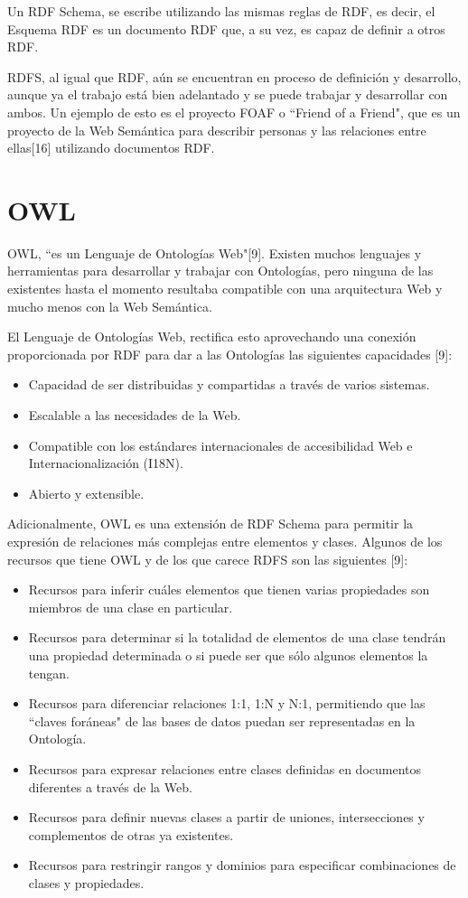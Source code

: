 Un RDF Schema, se escribe utilizando las mismas reglas de RDF, es decir, el Esquema RDF es un documento RDF que, a su vez, es capaz de definir a otros RDF.

RDFS, al igual que RDF, aún se encuentran en proceso de definición y desarrollo, aunque ya el trabajo está bien adelantado y se puede trabajar y desarrollar con ambos. Un ejemplo de esto es el proyecto FOAF o ``Friend of a Friend", que es un proyecto de la Web Semántica para describir personas y las relaciones entre ellas[16] utilizando documentos RDF.

\section{OWL}

OWL, ``es un Lenguaje de Ontologías Web"[9]. Existen muchos lenguajes y herramientas para desarrollar y trabajar con Ontologías, pero ninguna de las existentes hasta el momento resultaba compatible con una arquitectura Web y mucho menos con la Web Semántica. 

El Lenguaje de Ontologías Web, rectifica esto aprovechando una conexión proporcionada por RDF para dar a las Ontologías las siguientes capacidades [9]:

\begin{itemize}
\item Capacidad de ser distribuidas y compartidas a través de varios sistemas.
\item Escalable a las necesidades de la Web.
\item Compatible con los estándares internacionales de accesibilidad Web e Internacionalización (I18N).
\item Abierto y extensible.
\end{itemize}

Adicionalmente, OWL es una extensión de RDF Schema para permitir la expresión de relaciones más complejas entre elementos y clases. Algunos de los recursos que tiene OWL y de los que carece RDFS son las siguientes [9]:

\begin{itemize}
\item Recursos para inferir cuáles elementos que tienen varias propiedades son miembros de una clase en particular.
\item Recursos para determinar si la totalidad de elementos de una clase tendrán una propiedad determinada o si puede ser que sólo algunos elementos la tengan.
\item Recursos para diferenciar relaciones 1:1, 1:N y N:1, permitiendo que las ``claves foráneas" de las bases de datos puedan ser representadas en la Ontología.
\item Recursos para expresar relaciones entre clases definidas en documentos diferentes a través de la Web.
\item Recursos para definir nuevas clases a partir de uniones, intersecciones y complementos de otras ya existentes.
\item Recursos para restringir rangos y dominios para especificar combinaciones de clases y propiedades.
\end{itemize}

